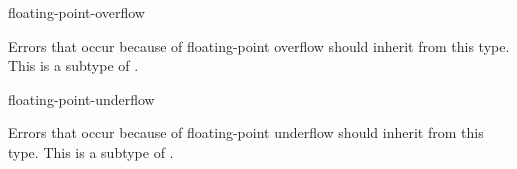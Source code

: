 \begin{defun}[Type]
floating-point-overflow

  Errors that occur because of floating-point overflow should inherit from
  this type. This is a subtype of .
\end{defun}

\begin{defun}[Type]
floating-point-underflow

  Errors that occur because of floating-point underflow should inherit from
  this type. This is a subtype of .
\end{defun}


